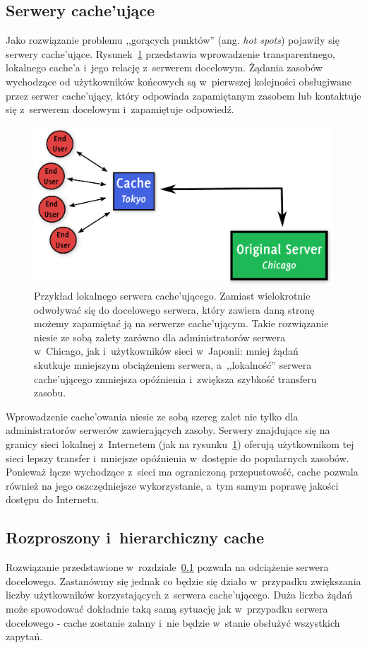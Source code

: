 \documentclass[a4paper,11pt]{scrartcl}
\newcommand{\s}{ }
\newcommand{\kesz}{cache}
\newcommand{\kesza}{cache'a}
\newcommand{\keszujace}{cache'ujące}
\newcommand{\keszujacego}{cache'ującego}
\newcommand{\keszujacy}{cache'ujący}
\newcommand{\keszujacym}{cache'ującym}
\newcommand{\keszowania}{cache'owania}
\begin{document}
\subsection{Serwery \keszujace}\label{sect_cache}
Jako rozwiązanie problemu ,,gorących punktów'' (ang. \textit{hot spots}) pojawiły się serwery \keszujace. Rysunek~\ref{fig_cache_server} przedstawia wprowadzenie transparentnego, lokalnego \kesza\s i~jego relację z~serwerem docelowym. 
Żądania zasobów wychodzące od użytkowników końcowych są w~pierwszej kolejności obsługiwane przez serwer \keszujacy, który odpowiada zapamiętanym zasobem lub kontaktuje się z~serwerem docelowym i~zapamiętuje odpowiedź.

\begin{figure}[ht]
\centering
\includegraphics[width=0.85\linewidth]{img/cache.pdf}
\caption{
Przykład lokalnego serwera \keszujacego.
Zamiast wielokrotnie odwoływać się do docelowego serwera, który zawiera daną stronę
możemy zapamiętać ją na serwerze \keszujacym. Takie rozwiązanie niesie ze sobą zalety
zarówno dla administratorów serwera w~Chicago, jak i~użytkowników sieci w~Japonii:
mniej żądań skutkuje mniejszym obciążeniem serwera, a~,,lokalność'' serwera \keszujacego\s zmniejsza opóźnienia i~zwiększa szybkość transferu zasobu.
}
\label{fig_cache_server}
\end{figure}

Wprowadzenie \keszowania\s niesie ze sobą szereg zalet nie tylko dla administratorów serwerów zawierających zasoby. Serwery znajdujące się na granicy sieci lokalnej z~Internetem (jak na rysunku~\ref{fig_cache_server}) oferują użytkownikom tej sieci lepszy transfer i~mniejsze opóźnienia w~dostępie do popularnych zasobów.
Ponieważ łącze wychodzące z~sieci ma ograniczoną przepustowość, \kesz\s pozwala również na jego oszczędniejsze wykorzystanie, a~tym samym poprawę jakości dostępu do Internetu.

\subsection{Rozproszony i~hierarchiczny \kesz}\label{sect_dist_cache}
Rozwiązanie przedstawione w~rozdziale~\ref{sect_cache} pozwala na odciążenie serwera docelowego. Zastanówmy się jednak co będzie się działo w~przypadku zwiększania liczby użytkowników korzystających z~serwera \keszujacego. Duża liczba żądań może spowodować dokładnie taką samą sytuację jak w~przypadku serwera docelowego - \kesz\s zostanie zalany i~nie będzie w~stanie obsłużyć wszystkich zapytań.
\end{document}
